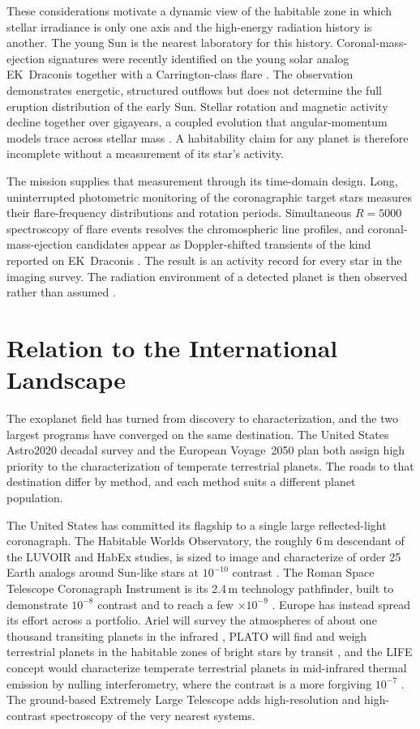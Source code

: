 These considerations motivate a dynamic view of the habitable zone in
which stellar irradiance is only one axis and the high-energy radiation
history is another. The young Sun is the nearest laboratory for this
history. Coronal-mass-ejection signatures were recently identified on
the young solar analog EK~Draconis together with a Carrington-class
flare \cite{namekata26}. The observation demonstrates energetic,
structured outflows but does not determine the full eruption
distribution of the early Sun.
Stellar rotation and magnetic activity decline together over gigayears,
a coupled evolution that angular-momentum models trace across stellar
mass \cite{gallet17}. A habitability claim for any planet is therefore
incomplete without a measurement of its star's activity.

The mission supplies that measurement through its time-domain design.
Long, uninterrupted photometric monitoring of the coronagraphic target
stars measures their flare-frequency distributions and rotation periods.
Simultaneous $R=5000$ spectroscopy of flare events resolves the
chromospheric line profiles, and coronal-mass-ejection candidates appear
as Doppler-shifted transients of the kind reported on EK~Draconis
\cite{namekata26}. The result is an activity record for every star in
the imaging survey. The radiation environment of a detected planet is
then observed rather than assumed \cite{chen21,hong23}.

\section{Relation to the International Landscape}
\label{sec:landscape}

The exoplanet field has turned from discovery to characterization, and
the two largest programs have converged on the same destination. The
United States Astro2020 decadal survey \cite{astro2020} and the
European Voyage~2050 plan \cite{voyage2050} both assign high priority
to the characterization of temperate terrestrial planets. The roads
to that destination differ by method, and each
method suits a different planet population.

The United States has committed its flagship to a single large
reflected-light coronagraph. The Habitable Worlds Observatory, the
roughly 6\,m descendant of the LUVOIR and HabEx studies, is sized to
image and characterize of order 25 Earth analogs around Sun-like stars at
$10^{-10}$ contrast \cite{astro2020,hwo26}. The Roman Space Telescope
Coronagraph Instrument is its 2.4\,m technology pathfinder, built to
demonstrate $10^{-8}$ contrast and to reach a few $\times10^{-9}$
\cite{bailey23,llopsayson25}. Europe has instead spread its effort across a portfolio.
Ariel will survey the atmospheres of about one thousand transiting
planets in the infrared \cite{tinetti18}, PLATO will find and weigh
terrestrial planets in the habitable zones of bright stars by transit
\cite{rauer14}, and the LIFE concept would characterize temperate
terrestrial planets in mid-infrared thermal emission by nulling
interferometry, where the contrast is a more forgiving $10^{-7}$
\cite{quanz22}. The ground-based Extremely Large Telescope adds
high-resolution and high-contrast spectroscopy of the very nearest
systems.

